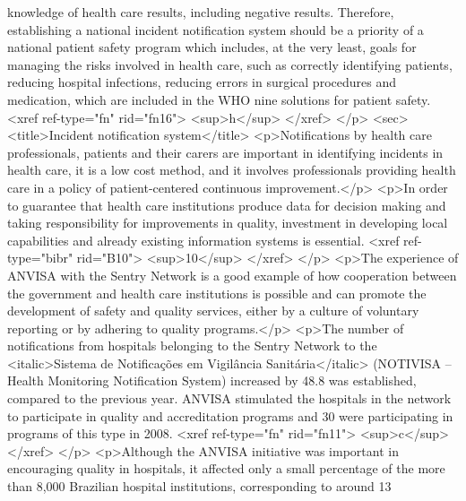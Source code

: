           knowledge of health care results, including negative results. Therefore, establishing a
          national incident notification system should be a priority of a national patient safety
          program which includes, at the very least, goals for managing the risks involved in health
          care, such as correctly identifying patients, reducing hospital infections, reducing
          errors in surgical procedures and medication, which are included in the WHO nine solutions
          for patient safety. <xref ref-type="fn" rid="fn16">
            <sup>h</sup>
          </xref>
        </p>
        <sec>
          <title>Incident notification system</title>
          <p>Notifications by health care professionals, patients and their carers are important in
            identifying incidents in health care, it is a low cost method, and it involves
            professionals providing health care in a policy of patient-centered continuous
            improvement.</p>
          <p>In order to guarantee that health care institutions produce data for decision making
            and taking responsibility for improvements in quality, investment in developing local
            capabilities and already existing information systems is essential. <xref
              ref-type="bibr" rid="B10">
              <sup>10</sup>
            </xref>
          </p>
          <p>The experience of ANVISA with the Sentry Network is a good example of how cooperation
            between the government and health care institutions is possible and can promote the
            development of safety and quality services, either by a culture of voluntary reporting
            or by adhering to quality programs.</p>
          <p>The number of notifications from hospitals belonging to the Sentry Network to the
              <italic>Sistema de Notificações em Vigilância Sanitária</italic> (NOTIVISA – Health
            Monitoring Notification System) increased by 48.8%
            was established, compared to the previous year. ANVISA stimulated the hospitals in the
            network to participate in quality and accreditation programs and 30%
            were participating in programs of this type in 2008. <xref ref-type="fn" rid="fn11">
              <sup>c</sup>
            </xref>
          </p>
          <p>Although the ANVISA initiative was important in encouraging quality in hospitals, it
            affected only a small percentage of the more than 8,000 Brazilian hospital institutions,
            corresponding to around 13%
